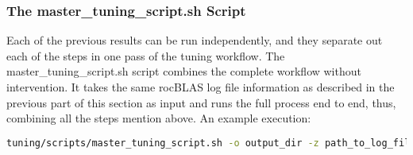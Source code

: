 \documentclass[]{article}
\begin{document}
\subsubsection{The master\_tuning\_script.sh Script}

Each of the previous results can be run independently, and they separate out each of the steps in one pass of the tuning workflow. The master\_tuning\_script.sh script combines the complete workflow without intervention. It takes the same rocBLAS log file information as described in the previous part of this section as input and runs the full process end to end, thus, combining all the steps mention above. An example execution:

\begin{lstlisting}[language=bash,breaklines=true]
tuning/scripts/master_tuning_script.sh -o output_dir -z path_to_log_file
\end{lstlisting}
\end{document}
